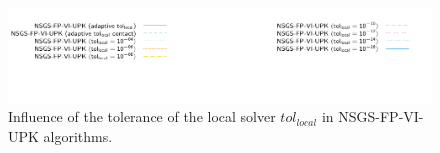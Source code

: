 \begin{figure}
\includegraphics[width=\legendwidth]{../figure/NSGS/LocalTol/VI/1.0e-08/100/time/profile-BoxesStack1_legend.pdf}
  \caption{Influence of the tolerance of the local solver $tol_{local}$ in NSGS-FP-VI-UPK algorithms.} 
\end{figure}
